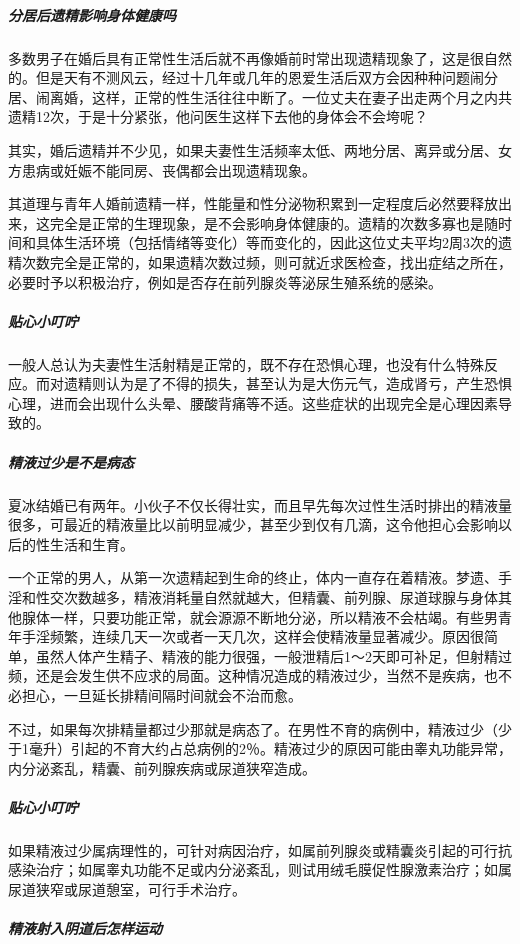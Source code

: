 \begin{enumerate}
\subparagraph{分居后遗精影响身体健康吗}

多数男子在婚后具有正常性生活后就不再像婚前时常出现遗精现象了，这是很自然的。但是天有不测风云，经过十几年或几年的恩爱生活后双方会因种种问题闹分居、闹离婚，这样，正常的性生活往往中断了。一位丈夫在妻子出走两个月之内共遗精12次，于是十分紧张，他问医生这样下去他的身体会不会垮呢？

其实，婚后遗精并不少见，如果夫妻性生活频率太低、两地分居、离异或分居、女方患病或妊娠不能同房、丧偶都会出现遗精现象。

其道理与青年人婚前遗精一样，性能量和性分泌物积累到一定程度后必然要释放出来，这完全是正常的生理现象，是不会影响身体健康的。遗精的次数多寡也是随时间和具体生活环境（包括情绪等变化）等而变化的，因此这位丈夫平均2周3次的遗精次数完全是正常的，如果遗精次数过频，则可就近求医检查，找出症结之所在，必要时予以积极治疗，例如是否存在前列腺炎等泌尿生殖系统的感染。

\subparagraph{贴心小叮咛}

一般人总认为夫妻性生活射精是正常的，既不存在恐惧心理，也没有什么特殊反应。而对遗精则认为是了不得的损失，甚至认为是大伤元气，造成肾亏，产生恐惧心理，进而会出现什么头晕、腰酸背痛等不适。这些症状的出现完全是心理因素导致的。

\subparagraph{精液过少是不是病态}

夏冰结婚已有两年。小伙子不仅长得壮实，而且早先每次过性生活时排出的精液量很多，可最近的精液量比以前明显减少，甚至少到仅有几滴，这令他担心会影响以后的性生活和生育。

一个正常的男人，从第一次遗精起到生命的终止，体内一直存在着精液。梦遗、手淫和性交次数越多，精液消耗量自然就越大，但精囊、前列腺、尿道球腺与身体其他腺体一样，只要功能正常，就会源源不断地分泌，所以精液不会枯竭。有些男青年手淫频繁，连续几天一次或者一天几次，这样会使精液量显著减少。原因很简单，虽然人体产生精子、精液的能力很强，一般泄精后1～2天即可补足，但射精过频，还是会发生供不应求的局面。这种情况造成的精液过少，当然不是疾病，也不必担心，一旦延长排精间隔时间就会不治而愈。

不过，如果每次排精量都过少那就是病态了。在男性不育的病例中，精液过少（少于1毫升）引起的不育大约占总病例的2％。精液过少的原因可能由睾丸功能异常，内分泌紊乱，精囊、前列腺疾病或尿道狭窄造成。

\subparagraph{贴心小叮咛}

如果精液过少属病理性的，可针对病因治疗，如属前列腺炎或精囊炎引起的可行抗感染治疗；如属睾丸功能不足或内分泌紊乱，则试用绒毛膜促性腺激素治疗；如属尿道狭窄或尿道憩室，可行手术治疗。

\subparagraph{精液射入阴道后怎样运动}


\end{enumerate}
